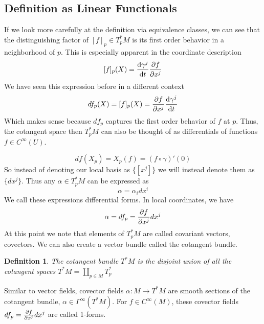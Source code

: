 \documentclass[a4paper]{article}
\newtheorem*{defn}{Definition}
\begin{document}
\subsection*{Definition as Linear Functionals}%
  
If we look more carefully at the definition via equivalence classes, we can see that the distinguishing factor of $[f]_p \in T_p^*M$ is its first order behavior in a neighborhood of $p$. This is especially apparent in the coordinate description
\[
  [f]_p(X) = \dv{\gamma^j}{t}\pdv{f}{x^j}
\]
We have seen this expression before in a different context
\[
  df_p(X) = [f]_p(X) = \pdv{f}{x^j}\dv{\gamma^j}{t}
\]
Which makes sense because $df_p$ captures the first order behavior of $f$ at $p$. Thus, the cotangent space then $T_p^*M$ can also be thought of as differentials of functions $f \in C^{\infty}(U)$.

  \[
    df(X_p) = X_p(f) = (f \circ \gamma)'(0)
  \]
  So instead of denoting our local basis as $\{[x^j]\}$ we will instead denote them as $\{dx^j\}$.
  Thus any $\alpha \in T_p^*M$ can be expressed as 
  \[
    \alpha = \alpha_i dx^i
  \]
  We call these expressions differential forms. In local coordinates, we have
  \[
    \alpha = df_p = \pdv{f}{x^j} dx^j
  \]
  At this point we note that elements of $T_p^*M$ are called covariant vectors, covectors. We can also create a vector bundle called the cotangent bundle.
   \begin{defn}
     The cotangent bundle $T^*M$ is the disjoint union of all the cotangent spaces $T^*M = \coprod_{p \in M} T^*_p$
   \end{defn}
  
   Similar to vector fields, covector fields $\alpha: M \rightarrow T^*M$ are smooth sections of the cotangent bundle, $\alpha \in \Gamma^{\infty}(T^*M)$. For $f \in C^{\infty}(M)$, these covector fields $df_p = \pdv{f}{x^j} dx^j$ are called 1-forms.
\end{document}
